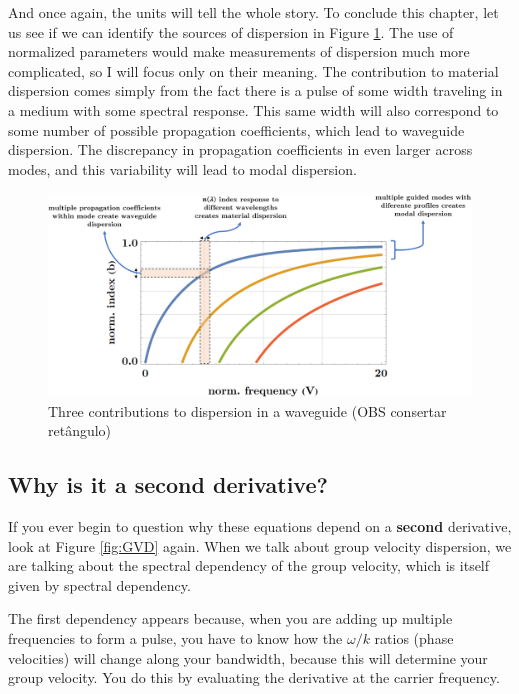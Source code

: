 And once again, the units will tell the whole story. To conclude this chapter, let us see if we can identify the sources of dispersion in Figure \ref{fig:dispersion.diagram}. The use of normalized parameters would make measurements of dispersion much more complicated, so I will focus only on their meaning. The contribution to material dispersion comes simply from the fact there is a pulse of some width traveling in a medium with some spectral response. This same width will also correspond to some number of possible propagation coefficients, which lead to waveguide dispersion. The discrepancy in propagation coefficients in even larger across modes, and this variability will lead to modal dispersion.

\begin{figure}[H]
    \centering
    \includegraphics[width=1\linewidth]{Figuras/dispersion types diagram.png}
    \caption{Three contributions to dispersion in a waveguide (OBS consertar retângulo)}
    \label{fig:dispersion.diagram}
\end{figure}

\subsection{Why is it a second derivative?}

If you ever begin to question why these equations depend on a \textbf{second} derivative, look at Figure \ref{fig:GVD} again. When we talk about group velocity dispersion, we are talking about the spectral dependency of the group velocity, which is itself given by spectral dependency.

The first dependency appears because, when you are adding up multiple frequencies to form a pulse, you have to know how the $\omega/k$ ratios (phase velocities) will change along your bandwidth, because this will determine your group velocity. You do this by evaluating the derivative at the carrier frequency.

